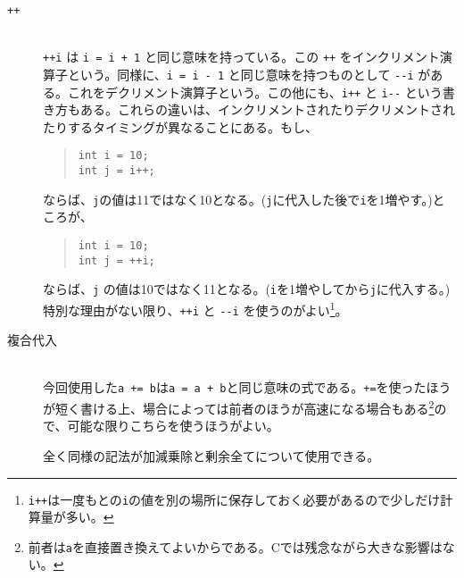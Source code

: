 \begin{description}
    \item[\texttt{++}]\mbox{}\\
          \texttt{++i} は \texttt{i = i + 1} と同じ意味を持っている。この \texttt{++} をインクリメント演算子という。同様に、\texttt{i = i - 1} と同じ意味を持つものとして \texttt{{-}{-}i} がある。これをデクリメント演算子という。この他にも、\texttt{i++} と \texttt{i{-}{-}} という書き方もある。これらの違いは、インクリメントされたりデクリメントされたりするタイミングが異なることにある。もし、
          \begin{quote}
              \begin{verbatim}
int i = 10;
int j = i++;
\end{verbatim}
          \end{quote}
          ならば、\texttt{j}の値は11ではなく10となる。(\texttt{j}に代入した後で\texttt{i}を1増やす。)ところが、
          \begin{quote}
              \begin{verbatim}
int i = 10;
int j = ++i;
\end{verbatim}
          \end{quote}
          ならば、\texttt{j} の値は10ではなく11となる。(\texttt{i}を1増やしてから\texttt{j}に代入する。)
          特別な理由がない限り、\texttt{++i} と \texttt{{-}{-}i} を使うのがよい\footnote{\texttt{i++}は一度もとの\texttt{i}の値を別の場所に保存しておく必要があるので少しだけ計算量が多い。}。
    \item[複合代入]\mbox{}\\
          今回使用した\texttt{a += b}は\texttt{a = a + b}と同じ意味の式である。\texttt{+=}を使ったほうが短く書ける上、場合によっては前者のほうが高速になる場合もある\footnote{前者は\texttt{a}を直接置き換えてよいからである。Cでは残念ながら大きな影響はない。}ので、可能な限りこちらを使うほうがよい。

          全く同様の記法が加減乗除と剰余全てについて使用できる。
\end{description}


